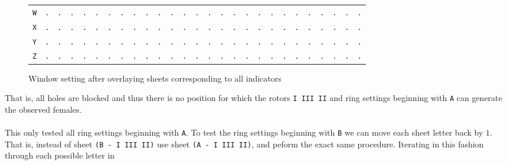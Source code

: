 \begin{figure}[H]
\begin{center}
{\begin{tabular}{c|cccccccccccccccccccccccccc}
				\texttt{W} & \texttt{.} & \texttt{.} & \texttt{.} &
				\texttt{.} & \texttt{.} & \texttt{.} & \texttt{.} &
				\texttt{.} & \texttt{.} & \texttt{.} & \texttt{.} &
				\texttt{.} & \texttt{.} & \texttt{.} & \texttt{.} &
				\texttt{.} & \texttt{.} & \texttt{.} & \texttt{.} &
				\texttt{.} & \texttt{.} & \texttt{.} & \texttt{.} &
				\texttt{.} & \texttt{.} & \texttt{.}                             \\
				\texttt{X} & \texttt{.} & \texttt{.} & \texttt{.} &
				\texttt{.} & \texttt{.} & \texttt{.} & \texttt{.} &
				\texttt{.} & \texttt{.} & \texttt{.} & \texttt{.} &
				\texttt{.} & \texttt{.} & \texttt{.} & \texttt{.} &
				\texttt{.} & \texttt{.} & \texttt{.} & \texttt{.} &
				\texttt{.} & \texttt{.} & \texttt{.} & \texttt{.} &
				\texttt{.} & \texttt{.} & \texttt{.}                             \\
				\texttt{Y} & \texttt{.} & \texttt{.} & \texttt{.} &
				\texttt{.} & \texttt{.} & \texttt{.} & \texttt{.} &
				\texttt{.} & \texttt{.} & \texttt{.} & \texttt{.} &
				\texttt{.} & \texttt{.} & \texttt{.} & \texttt{.} &
				\texttt{.} & \texttt{.} & \texttt{.} & \texttt{.} &
				\texttt{.} & \texttt{.} & \texttt{.} & \texttt{.} &
				\texttt{.} & \texttt{.} & \texttt{.}                             \\
				\texttt{Z} & \texttt{.} & \texttt{.} & \texttt{.} &
				\texttt{.} & \texttt{.} & \texttt{.} & \texttt{.} &
				\texttt{.} & \texttt{.} & \texttt{.} & \texttt{.} &
				\texttt{.} & \texttt{.} & \texttt{.} & \texttt{.} &
				\texttt{.} & \texttt{.} & \texttt{.} & \texttt{.} &
				\texttt{.} & \texttt{.} & \texttt{.} & \texttt{.} &
				\texttt{.} & \texttt{.} & \texttt{.}                             \\
			\end{tabular}
		}
	\end{center}
	\caption{Window setting after overlaying sheets corresponding to
		all indicators}
\end{figure}
\noindent That is, all holes are blocked and thus there is no
position for which the rotors \texttt{I III II} and ring settings
beginning with \texttt{A} can generate the observed females.
\\\\This only tested all ring settings beginning with \texttt{A}. To
test the ring settings beginning with \texttt{B} we can move each
sheet letter back by $1$. That is, instead of sheet \texttt{(B - I
	III II)} use sheet \texttt{(A - I III II)}, and peform the exact same
procedure. Iterating in this fashion through each possible letter in
